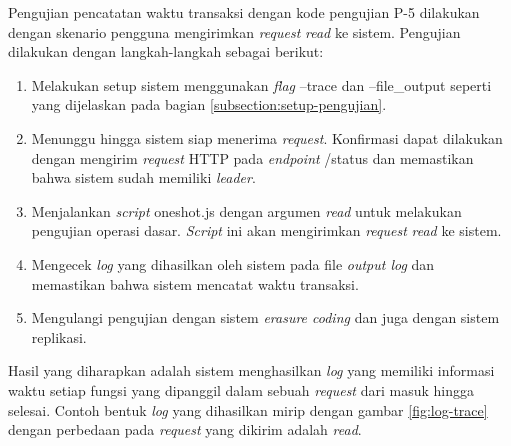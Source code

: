 Pengujian pencatatan waktu transaksi dengan kode pengujian P-5 dilakukan dengan skenario pengguna mengirimkan \textit{request} \textit{read} ke sistem. Pengujian dilakukan dengan langkah-langkah sebagai berikut:

\begin{enumerate}
  \item Melakukan setup sistem menggunakan \textit{flag} --trace dan --file\_output seperti yang dijelaskan pada bagian \ref{subsection:setup-pengujian}.
  \item Menunggu hingga sistem siap menerima \textit{request}. Konfirmasi dapat dilakukan dengan mengirim \textit{request} HTTP pada \textit{endpoint} /status dan memastikan bahwa sistem sudah memiliki \textit{leader}.
  \item Menjalankan \textit{script} oneshot.js dengan argumen \textit{read} untuk melakukan pengujian operasi dasar. \textit{Script} ini akan mengirimkan \textit{request} \textit{read} ke sistem.
  \item Mengecek \textit{log} yang dihasilkan oleh sistem pada file \textit{output log} dan memastikan bahwa sistem mencatat waktu transaksi.
  \item Mengulangi pengujian dengan sistem \textit{erasure coding} dan juga dengan sistem replikasi.
\end{enumerate}

Hasil yang diharapkan adalah sistem menghasilkan \textit{log} yang memiliki informasi waktu setiap fungsi yang dipanggil dalam sebuah \textit{request} dari masuk hingga selesai. Contoh bentuk \textit{log} yang dihasilkan mirip dengan gambar \ref{fig:log-trace} dengan perbedaan pada \textit{request} yang dikirim adalah \textit{read}.